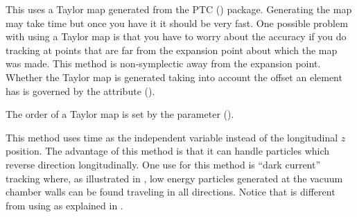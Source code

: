 \begin{description}
\item[\vn{Taylor}]
This uses a Taylor map generated from the PTC () package. Generating the map may
take time but once you have it it should be very fast. One possible problem with using a Taylor map
is that you have to worry about the accuracy if you do tracking at points that are far from the
expansion point about which the map was made. This method is non-symplectic away from the expansion
point. Whether the Taylor map is generated taking into account the offset an element has is governed
by the  attribute ().

The order of a Taylor map is set by the 
parameter ().

\item[\vn{Time_Runge_Kutta}]
This method uses time as the independent variable instead of the longitudinal $z$ position. The
advantage of this method is that it can handle particles which reverse direction longitudinally.
One use for this method is ``dark current'' tracking where, as illustrated in ,
low energy particles generated at the vacuum chamber walls can be found traveling in all
directions. Notice that  is different from using  as
explained in .

\end{description}


